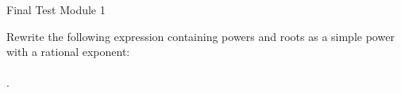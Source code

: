 \begin{MTest}{Final Test Module 1}
\begin{MExercise}
Rewrite the following expression containing powers and roots as a simple power with a rational exponent:
\ \\ \ \\
.\\
\end{MExercise}
\end{MTest}

\newpage
\MPrintIndex



